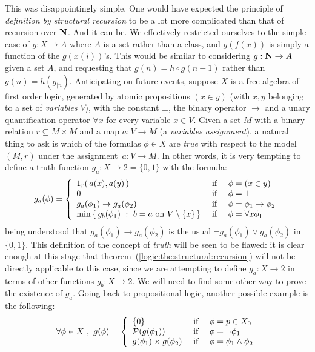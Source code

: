This was disappointingly simple. One would have expected the
principle of {\em definition by structural recursion} to be a lot
more complicated than that of recursion over $\mbox{$\bf N$}$. And it can be. We
effectively restricted ourselves to the simple case of $g:X\to A$
where $A$ is a set rather than a class, and $g(f(x))$ is simply a
function of the $g(x(i))$'s. This would be similar to considering
$g:\mbox{$\bf N$}\to A$ given a set $A$, and requesting that $g(n)=h\circ
g(n-1)$ rather than $g(n)=h(g_{|n})$. Anticipating on future events,
suppose $X$ is a free algebra of first order logic, generated by
atomic propositions $(x\in y)$ (with $x,y$ belonging to a set of
{\em variables} $V$),  with the constant $\bot$, the binary operator
$\to$ and a unary quantification operator $\forall x$ for every
variable $x\in V$. Given a set $M$ with a binary relation
$r\subseteq M\times M$ and a map $a:V\to M$ (a {\em variables
assignment}), a natural thing to ask is which of the formulas
$\phi\in X$ are {\em true} with respect to the model $(M,r)$ under
the assignment~$a:V\to M$. In other words, it is very tempting to
define a truth function $g_{a}:X\to 2=\{0,1\}$ with the formula:
    \[
                    g_{a}(\phi)=\left\{
                    \begin{array}{lcl}
                    1_{r}(\,a(x),a(y)\,)&\mbox{\ if\ }&\phi=(x\in y)\\
                    0&\mbox{\ if\ }&\phi=\bot\\
                    g_{a}(\phi_{1})\to g_{a}(\phi_{2})&\mbox{\ if\ }&
                    \phi=\phi_{1}\to\phi_{2}\\
                    \min\left\{\,g_{b}(\phi_{1})\ :\  b=a\mbox{\ on\
                    }V\setminus\{x\}\,\right\}
                    &\mbox{\ if\ }&\phi=\forall x\phi_{1}\\
                    \end{array}\right.
    \]
being understood that $g_{a}(\phi_{1})\to g_{a}(\phi_{2})$ is the
usual $\lnot g_{a}(\phi_{1})\lor g_{a}(\phi_{2})$ in $\{0,1\}$. This
definition of the concept of {\em truth} will be seen to be flawed:
it is clear enough at this stage that
theorem~(\ref{logic:the:structural:recursion}) will not be directly
applicable to this case, since we are attempting to define
$g_{a}:X\to 2$ in terms of other functions $g_{b}:X\to 2$. We will
need to find some other way to prove the existence of $g_{a}$. Going
back to propositional logic, another possible example is the
following:
\begin{equation}\label{logic:eqn:class:propositional}
    \forall\phi\in X\ ,\ g(\phi)=\left\{
                    \begin{array}{lcl}
                    \{0\}&\mbox{\ if\ }&\phi=p\in X_{0}\\
                    {\cal P}(g(\phi_{1}))&\mbox{\ if\ }&\phi=\lnot\phi_{1}\\
                    g(\phi_{1})\times g(\phi_{2})&\mbox{\ if\ }&\phi=\phi_{1}\land\phi_{2}
                    \end{array}\right.
    \end{equation}
